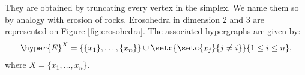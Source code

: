 \begin{example}[{\bf Hypercubes}]
\begin{center}
{
}\end{center} \demo
\end{example}
\begin{example}[{\bf Erosohedra}] \label{eroso} They are obtained by truncating every vertex in the simplex. We name them so by  analogy with erosion of rocks. Erosohedra in dimension 2 and 3 are represented on Figure \ref{fig:erosohedra}. The associated hypergraphs are given by:
\begin{align*}
 \hyper{E}^X=\{\{x_1\},\dots,\{x_n\}\}\cup\setc{\setc{x_j}{j \neq i}}{1\leq i\leq n},
\end{align*} 
where $X=\{x_1, \ldots, x_n\}$.


\end{example}
